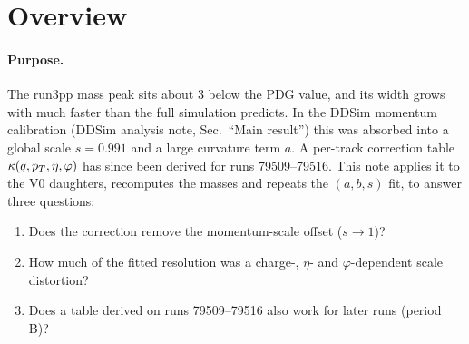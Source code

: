 \section{Overview}
\label{sec:overview}

\paragraph{Purpose.} The run3pp \Ks{} mass peak sits about 3\mevcc{} below the PDG value, and its width grows with \pt{}
much faster than the full simulation predicts. In the DDSim momentum calibration (DDSim analysis note, Sec.~``Main result'')
this was absorbed into a global scale $s=0.991$ and a large curvature term $a$. A per-track correction table
$\kappa(q,p_T,\eta,\varphi)$ has since been derived for runs 79509--79516. This note applies it to the V0 daughters,
recomputes the masses and repeats the $(a,b,s)$ fit, to answer three questions:
\begin{enumerate}
\item Does the correction remove the momentum-scale offset ($s\to1$)?
\item How much of the fitted resolution was a charge-, $\eta$- and $\varphi$-dependent scale distortion?
\item Does a table derived on runs 79509--79516 also work for later runs (period B)?
\end{enumerate}

